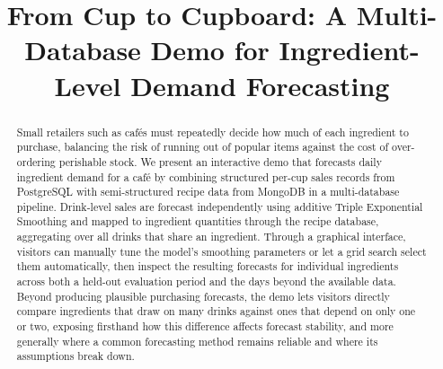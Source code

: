 \documentclass[conference]{IEEEtran}
\begin{document}
\title{From Cup to Cupboard: A Multi-Database Demo for Ingredient-Level Demand Forecasting}

\author{
\and
{}
\and
{}
}

\maketitle

\begin{abstract}
Small retailers such as cafés must repeatedly decide how much of each ingredient to purchase, balancing the risk of running out of popular items against the cost of over-ordering perishable stock. We present an interactive demo that forecasts daily ingredient demand for a café by combining structured per-cup sales records from PostgreSQL with semi-structured recipe data from MongoDB in a multi-database pipeline. Drink-level sales are forecast independently using additive Triple Exponential Smoothing and mapped to ingredient quantities through the recipe database, aggregating over all drinks that share an ingredient. Through a graphical interface, visitors can manually tune the model's smoothing parameters or let a grid search select them automatically, then inspect the resulting forecasts for individual ingredients across both a held-out evaluation period and the days beyond the available data. Beyond producing plausible purchasing forecasts, the demo lets visitors directly compare ingredients that draw on many drinks against ones that depend on only one or two, exposing firsthand how this difference affects forecast stability, and more generally where a common forecasting method remains reliable and where its assumptions break down.
\end{abstract}
\end{document}
